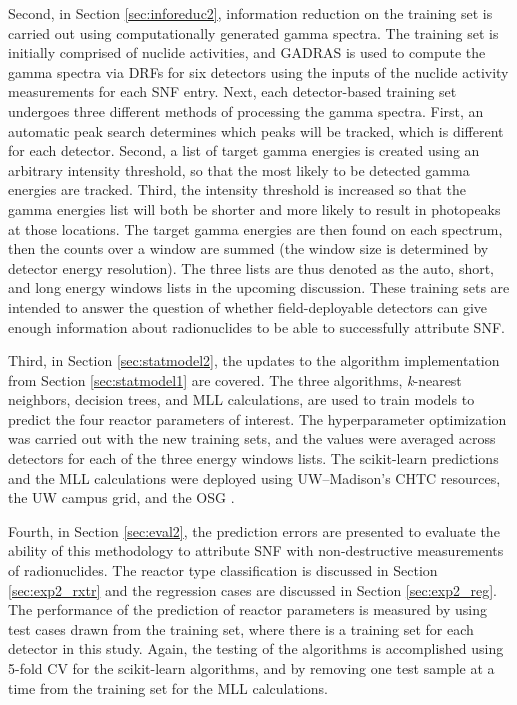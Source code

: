 Second, in Section \ref{sec:inforeduc2}, information reduction on the training
set is carried out using computationally generated gamma spectra.  The training
set is initially comprised of nuclide activities, and \gls{GADRAS} is used to
compute the gamma spectra via \gls{DRF}s for six detectors \cite{gadras} using
the inputs of the nuclide activity measurements for each \gls{SNF} entry.
Next, each detector-based training set undergoes three different methods of
processing the gamma spectra. First, an automatic peak search determines which
peaks will be tracked, which is different for each detector. Second, a list of
target gamma energies is created using an arbitrary intensity threshold, so
that the most likely to be detected gamma energies are tracked. Third, the
intensity threshold is increased so that the gamma energies list will both be
shorter and more likely to result in photopeaks at those locations.  The target
gamma energies are then found on each spectrum, then the counts over a window
are summed (the window size is determined by detector energy resolution). The
three lists are thus denoted as the auto, short, and long energy windows lists
in the upcoming discussion.  These training sets are intended to answer the
question of whether field-deployable detectors can give enough information
about radionuclides to be able to successfully attribute \gls{SNF}. 

Third, in Section \ref{sec:statmodel2}, the updates to the algorithm
implementation from Section \ref{sec:statmodel1} are covered. The three
algorithms, \textit{k}-nearest neighbors, decision trees, and \gls{MLL}
calculations, are used to train models to predict the four reactor parameters
of interest. The hyperparameter optimization was carried out with the new
training sets, and the values were averaged across detectors for each of the
three energy windows lists.  The scikit-learn predictions and the \gls{MLL}
calculations were deployed using \gls{UW}--Madison's \gls{CHTC} resources, the
\gls{UW} campus grid, and the \gls{OSG} \cite{osg07, osg09}.  

Fourth, in Section \ref{sec:eval2}, the prediction errors are presented to
evaluate the ability of this methodology to attribute \gls{SNF} with
non-destructive measurements of radionuclides. The reactor type classification
is discussed in Section \ref{sec:exp2_rxtr} and the regression cases are
discussed in Section \ref{sec:exp2_reg}.  The performance of the prediction of
reactor parameters is measured by using test cases drawn from the training set,
where there is a training set for each detector in this study.  Again, the
testing of the algorithms is accomplished using 5-fold \gls{CV} for the
scikit-learn algorithms, and by removing one test sample at a time from the
training set for the \gls{MLL} calculations.

